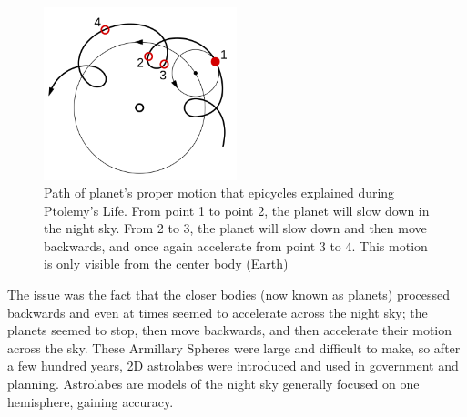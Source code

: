 \documentclass[12pt,oneside,a4paper,english]{article}
\begin{document}
\begin{figure}[H]
    \centering
    \includegraphics[width=0.5\textwidth]{AstroTools1.png}
    \caption{Path of planet's proper motion that epicycles explained during Ptolemy's Life. From point 1 to point 2, the planet will slow down in the night sky. From 2 to 3, the planet will slow down and then move backwards, and once again accelerate from point 3 to 4. This motion is only visible from the center body (Earth)\cite{ptolopic}}

    \label{fig:epicycles}
\end{figure}
The issue was the fact that the closer bodies (now known as planets) processed backwards and even at times seemed to accelerate across the night sky; the planets seemed to stop, then move backwards, and then accelerate their motion across the sky. These Armillary Spheres were large and difficult to make, so after a few hundred years, 2D astrolabes were introduced and used in government and planning. Astrolabes are models of the night sky generally focused on one hemisphere, gaining accuracy. 
\end{document}
